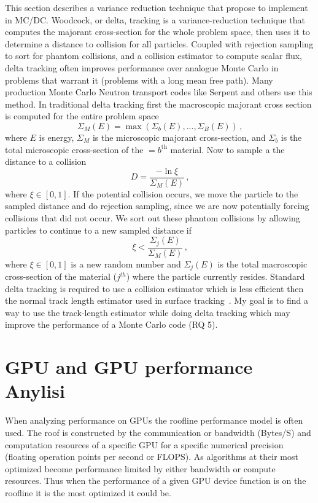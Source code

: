 This section describes a variance reduction technique that propose to implement in MC/DC.
Woodcock, or delta, tracking \cite{woodcock1965} is a variance-reduction technique that computes the majorant cross-section for the whole problem space, then uses it to determine a distance to collision for all particles.
Coupled with rejection sampling to sort for phantom collisions, and a collision estimator to compute scalar flux, delta tracking often improves performance over analogue Monte Carlo in problems that warrant it (problems with a long mean free path).
Many production Monte Carlo Neutron transport codes like Serpent \cite{Serpent2013, leppanen_use_2017, leppanen_performance_2010} and others \cite{delta2017rowland} use this method.
In traditional delta tracking first the macroscopic majorant cross section is computed for the entire problem space
\begin{equation}
    \label{eq:majorant}
    \Sigma_{M}(E) = \max\left(\Sigma_{b}(E), ..., \Sigma_{B}(E)\right) \,\text{,}
\end{equation}
where $E$ is energy, $\Sigma_{M}$ is the microscopic majorant cross-section, and $\Sigma_{b}$ is the total microscopic cross-section of the $=b^{\text{th}}$ material.
Now to sample a the distance to a collision
\begin{equation}
    \label{eq:sample}
    D = \frac{-\ln{\xi}}{\Sigma_{M}(E)} \, \text{,} 
\end{equation}
where $\xi\in[0,1]$.
If the potential collision occurs, we move the particle to the sampled distance and do rejection sampling, since we are now potentially forcing collisions that did not occur.
We sort out these phantom collisions by allowing particles to continue to a new sampled distance if
\begin{equation}
    \label{eq:reject}
    \xi < \frac{ \Sigma_{j}(E) } { \Sigma_M(E) } \, \text{,}
\end{equation}
where $\xi\in[0,1]$ is a new random number and $\Sigma_{j}(E)$ is the total macroscopic cross-section of the material ($j^{th}$) where the particle currently resides.
Standard delta tracking is required to use a collision estimator which is less efficient then the normal track length estimator used in surface tracking~\cite{mc2018}.
My goal is to find a way to use the track-length estimator while doing delta tracking which may improve the performance of a Monte Carlo code (RQ 5).

\if
\section{GPU and GPU performance Anylisi}
When analyzing performance on GPUs the roofline performance model is often used.
The roof is constructed by the communication or bandwidth (Bytes/S) and computation resources of a specific GPU for a specific numerical precision (floating operation points per second or FLOPS).
As algorithms at their most optimized become performance limited by either bandwidth or compute resources.
Thus when the performance of a given GPU device function is on the roofline it is the most optimized it could be.

